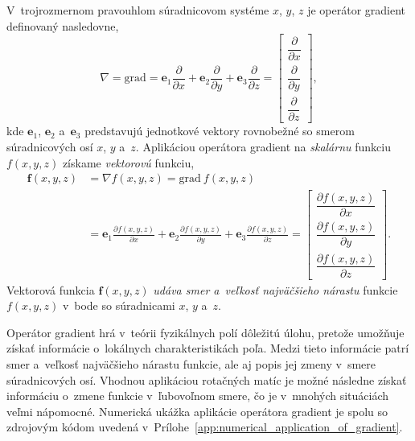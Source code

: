 \documentclass[a4paper, 12pt]{book}
\newcommand{\grad}{\mathrm{grad}}
\let\vec\mathbf
\begin{document}
V~trojrozmernom pravouhlom súradnicovom systéme $x$, $y$, $z$ je operátor 
gradient definovaný nasledovne,
%
\begin{equation}
\label{eq:gradient}
\nabla = \grad = \vec e_1 \frac{\partial}{\partial x} + \vec e_2 
\frac{\partial}{\partial y} + \vec e_3 \frac{\partial}{\partial z} =
\begin{bmatrix}
\dfrac{\partial}{\partial x} \\[2ex]
\dfrac{\partial}{\partial y} \\[2ex]
\dfrac{\partial}{\partial z}
\end{bmatrix}
{,}
\end{equation}
%
kde $\vec e_1$, $\vec e_2$ a~$\vec e_3$ predstavujú jednotkové vektory 
rovnobežné so smerom súradnicových osí $x$, $y$ a~$z$.  Aplikáciou operátora 
gradient na \emph{skalárnu} funkciu $f(x, y, z)$ získame \emph{vektorovú} 
funkciu,
%
\begin{equation}
\begin{split}
\vec f(x, y, z) &= \nabla f(x, y, z) = \grad \ f(x, y, z)\\
%
&= \vec e_1 \frac{\partial f(x, y, z)}{\partial x} + \vec e_2 \frac{\partial 
f(x, y, z)}{\partial y} + \vec e_3 \frac{\partial f(x, y, z)}{\partial z} =
\begin{bmatrix}
\dfrac{\partial f(x, y, z)}{\partial x} \\[2ex]
\dfrac{\partial f(x, y, z)}{\partial y} \\[2ex]
\dfrac{\partial f(x, y, z)}{\partial z}
\end{bmatrix}
{.}
\end{split}
\end{equation}
%
Vektorová funkcia $\vec f(x, y, z)$ \emph{udáva smer a~veľkosť najväčšieho 
nárastu} funkcie $f(x, y, z)$ v~bode so súradnicami $x$, $y$ a~$z$.

Operátor gradient hrá v~teórii fyzikálnych polí dôležitú úlohu, pretože 
umožňuje získať informácie o~lokálnych charakteristikách poľa.  Medzi tieto 
informácie patrí smer a~veľkosť najväčšieho nárastu funkcie, ale aj popis jej 
zmeny v~smere súradnicových osí.  Vhodnou aplikáciou rotačných matíc je možné 
následne získať informáciu o~zmene funkcie v~ľubovoľnom smere, čo je v~mnohých 
situáciách veľmi nápomocné.  Numerická ukážka aplikácie operátora gradient je 
spolu so zdrojovým kódom uvedená 
v~Prílohe~\ref{app:numerical_application_of_gradient}.
\end{document}
